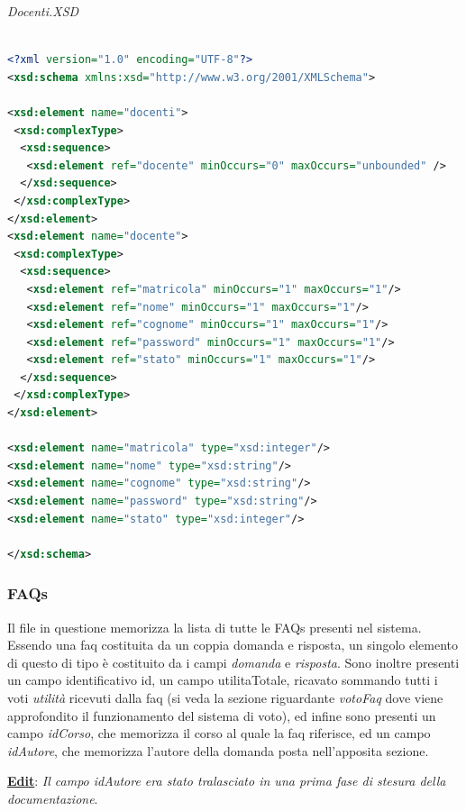 \documentclass [a4paper,11pt]{book}
\begin{document}
\medskip

\emph{Docenti.XSD}

\begin{lstlisting}[language=XML]

<?xml version="1.0" encoding="UTF-8"?>
<xsd:schema xmlns:xsd="http://www.w3.org/2001/XMLSchema">

<xsd:element name="docenti">
 <xsd:complexType>
  <xsd:sequence>
   <xsd:element ref="docente" minOccurs="0" maxOccurs="unbounded" />
  </xsd:sequence>
 </xsd:complexType>
</xsd:element>
<xsd:element name="docente">
 <xsd:complexType>
  <xsd:sequence>
   <xsd:element ref="matricola" minOccurs="1" maxOccurs="1"/>
   <xsd:element ref="nome" minOccurs="1" maxOccurs="1"/>
   <xsd:element ref="cognome" minOccurs="1" maxOccurs="1"/>
   <xsd:element ref="password" minOccurs="1" maxOccurs="1"/>
   <xsd:element ref="stato" minOccurs="1" maxOccurs="1"/>
  </xsd:sequence>
 </xsd:complexType>
</xsd:element>

<xsd:element name="matricola" type="xsd:integer"/>
<xsd:element name="nome" type="xsd:string"/>
<xsd:element name="cognome" type="xsd:string"/>
<xsd:element name="password" type="xsd:string"/>
<xsd:element name="stato" type="xsd:integer"/>
  
</xsd:schema>
\end{lstlisting}

\medskip

\subsubsection{FAQs}	%

Il file in questione memorizza la lista di tutte le FAQs presenti nel sistema. Essendo una faq costituita da un coppia domanda e risposta, un singolo elemento di questo di tipo è costituito da i campi \emph{domanda} e \emph{risposta}. Sono inoltre presenti un campo identificativo id, un campo utilitaTotale, ricavato sommando tutti i voti \emph{utilità} ricevuti dalla faq (si veda la sezione riguardante \emph{votoFaq} dove viene approfondito il funzionamento del sistema di voto), ed infine sono presenti un campo \emph{idCorso}, che memorizza il corso al quale la faq riferisce, ed un campo \emph{idAutore}, che memorizza l'autore della domanda posta nell'apposita sezione.

\textbf{\underline{Edit}}: \emph{Il campo idAutore era stato tralasciato in una prima fase di stesura della documentazione}.

\medskip
\end{document}
